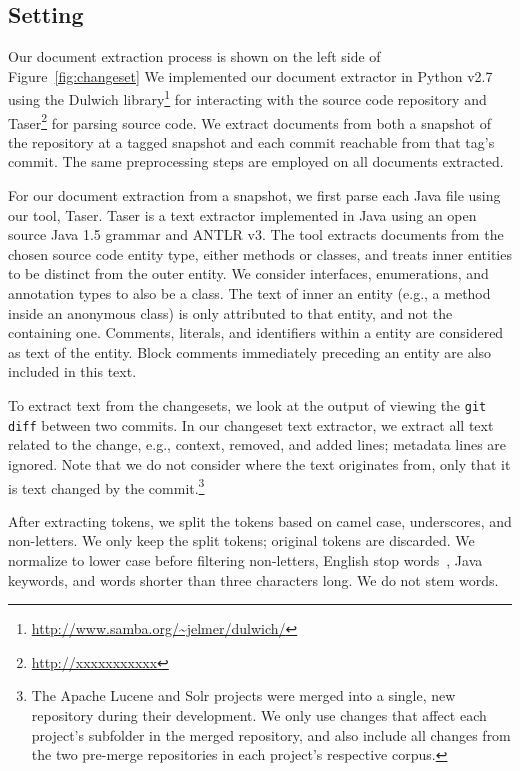 
\subsection{Setting}

Our document extraction process is shown on the left side of Figure~\ref{fig:changeset}
We implemented our document extractor in Python v2.7
using the Dulwich library\footnote{\url{http://www.samba.org/~jelmer/dulwich/}}
for interacting with the source code repository and
Taser\footnote{\url{http://xxxxxxxxxxx}} for parsing source code.
We extract documents from both a snapshot of the repository at a tagged
snapshot and each commit reachable from that tag's commit.
The same preprocessing steps are employed on all documents extracted.

For our document extraction from a snapshot, we first parse each Java file using our tool, Taser.
Taser is a text extractor implemented in Java using an open source Java 1.5 grammar and ANTLR v3.
The tool extracts documents from the chosen source code entity type,
either methods or classes, and treats inner entities to be distinct from the outer entity.
We consider interfaces, enumerations, and annotation types to also be a class.
The text of inner an entity (e.g., a method inside an anonymous class)
is only attributed to that entity, and not the containing one.
Comments, literals, and identifiers within a entity are considered as text of the entity.
Block comments immediately preceding an entity are also included in this text.

To extract text from the changesets, we look at the output of viewing
the \texttt{git diff} between two commits.
In our changeset text extractor, we extract all text related to the
change, e.g., context, removed, and added lines; metadata lines are ignored.
Note that we do not consider where the text originates from,
only that it is text changed by the commit.\footnote{
The Apache Lucene and Solr projects were merged into a single, new repository
during their development.
We only use changes that affect each project's subfolder in the merged repository,
and also include all changes from the two pre-merge repositories in each project's respective corpus.
}


After extracting tokens, we split the tokens based on camel case,
underscores, and non-letters.
We only keep the split tokens; original tokens are discarded.
We normalize to lower case before filtering non-letters, English stop words~\cite{StopWords}, Java keywords, and words shorter than three characters long.
We do not stem words. 

